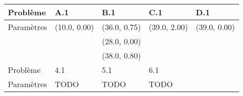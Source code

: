 \begin{tabular}{*{5}{C{75pt}}}
	\toprule
	Problème   & A.1          & B.1          & C.1          & D.1 \\
	\midrule
	Paramètres & (10.0, 0.00) & (36.0, 0.75) & (39.0, 2.00) & (39.0, 0.00) \\
	           &              & (28.0, 0.00) &              & \\
	           &              & (38.0, 0.80) &              & \\
	\bottomrule
	\toprule
	Problème   & 4.1          & 5.1          & 6.1          & \\
	\midrule
	Paramètres & TODO         & TODO         & TODO         & \\
	\bottomrule
\end{tabular}

